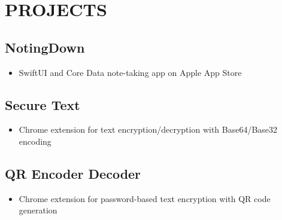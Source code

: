 \documentclass[11pt,a4paper]{moderncv}
\begin{document}
\begin{minipage}[t]{0.62\textwidth}
\section{PROJECTS}
\subsection{NotingDown}
\begin{itemize}
    \item SwiftUI and Core Data note-taking app on Apple App Store
\end{itemize}

\subsection{Secure Text}
\begin{itemize}
    \item Chrome extension for text encryption/decryption with Base64/Base32 encoding
\end{itemize}

\subsection{QR Encoder Decoder}
\begin{itemize}
    \item Chrome extension for password-based text encryption with QR code generation
\end{itemize}

\end{minipage}
\hfill
\end{document}
